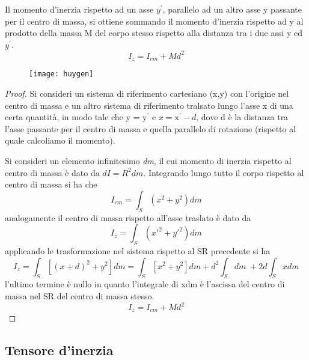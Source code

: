 \begin{theorem}
	Il momento d'inerzia rispetto ad un asse $y^{\prime}$, parallelo ad un altro asse y passante per il centro di massa, si ottiene sommando il momento d'inerzia rispetto ad y al prodotto della massa M del corpo stesso rispetto alla distanza tra i due assi y ed $y^{\prime}$.
\begin{equation}
	\boxed{I_{z} = I_{cm} + Md^2}
\end{equation}
\end{theorem}
 
\begin{figure}[!ht]
\vspace{0.1in}
\texttt{[image: huygen]}	
\centering
\end{figure}
 \begin{proof}
 	Si consideri un sistema di riferimento cartesiano (x,y) con l'origine nel centro di massa e un altro sistema di riferimento tralsato lungo l'asse x di una certa quantit\`{a}, in modo tale che y = $\text{y}^{\prime}$  e $x = \text{x}^{\prime} -d$, dove d \`{e} la distanza tra l'asse passante per il centro di massa e quella parallelo di rotazione (rispetto al quale calcoliamo il momento).
 	\newline
 	
 	\noindent Si consideri un elemento infinitesimo \textit{dm}, il cui momento di inerzia rispetto al centro di massa \`{e} dato da $dI = R^2dm$. Integrando lungo tutto il corpo rispetto al centro di massa si ha che
 	\begin{equation*}
 		I_{cm} = \int_{S}(x^2 + y^2)dm
 	\end{equation*}
analogamente il centro di massa rispetto all'asse traslato \`{e} dato da 
\begin{equation*}
	I_{z} = \int_{S}(x'^{2}+y'^{2})dm  
\end{equation*}
applicando le trasformazione nel sistema rispetto al SR precedente si ha
\begin{equation*}
	I_{z} = \int_{S}[(x+d)^2+y^2]dm = \int_{S}[x^2+y^2]dm + d^2 \int_{S}dm   \;+ 2d \int_{S}xdm
\end{equation*}
l'ultimo termine \`{e} nullo in quanto l'integrale di xdm \`{e} l'ascissa del centro di massa nel SR del centro di massa stesso.
\begin{equation*}
	I_{z} = I_{cm} + Md^2
\end{equation*} 
 \end{proof}

\subsection{Tensore d'inerzia}

